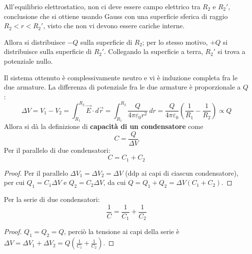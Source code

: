 \documentclass[10pt, a4paper]{scrartcl}
\numberwithin{equation}{subsection}
\theoremstyle{style1}
\newenvironment{boxenv}[1][]{
    \begin{eqbox}[#1]
    }{
   \end{eqbox}
}
\begin{document}
All'equilibrio elettrostatico, non ci deve essere campo elettrico tra $R_2$ e $R_2'$, conclusione che si ottiene usando Gauss con una superficie sferica di raggio $R_2 < r<R_2'$, visto che non vi devono essere cariche interne.

Allora si distribuisce $-Q$ sulla superficie di $R_2$; per lo stesso motivo, $+Q$ si distribuisce sulla superficie di $R_2'$. Collegando la superficie a terra, $R_2'$ si trova a potenziale nullo. 

Il sistema ottenuto \`e complessivamente neutro e vi \`e induzione completa fra le due armature. La differenza di potenziale fra le due armature \`e proporzionale a $Q$:
\begin{equation}
	\Delta V = V_1 - V_2 = \int_{R_1} ^{R_{2} } \vec{E}\cdot d\vec{r}  = \int_{R_1} ^{R_2} \frac{Q}{4\pi \varepsilon _0 r^2}\ dr = \frac{Q}{4\pi \varepsilon _0}\left(\frac{1}{R_1}- \frac{1}{R_{2} }\right) \propto Q 
\end{equation}
Allora si d\`a la definizione di \textbf{capacit\`a di un condensatore} come 
\begin{equation}
	C = \frac{Q}{\Delta V}
\end{equation}
Per il parallelo di due condensatori:
\begin{equation}
	C = C_1 + C_2
\end{equation}
\begin{boxenv}[]
\begin{proof}
	Per il parallelo $\Delta V_1 = \Delta V_2 = \Delta V$ (ddp ai capi di ciascun condensatore), per cui $Q_1=C_1\Delta V$ e $Q_2 = C_2 \Delta V$, da cui $Q = Q_1+Q_2 = \Delta V(C_1+C_2)$.
\end{proof}
\end{boxenv}
Per la serie di due condensatori:
\begin{equation}
	\frac{1}{C} = \frac{1}{C_1}+\frac{1}{C_2}
\end{equation}
\begin{boxenv}
\begin{proof}
	$Q_1=Q_2=Q$, perci\`o la tensione ai capi della serie \`e $\Delta V= \Delta V_1 + \Delta V_2= Q \left(\frac{1}{C_1}+\frac{1}{C_2}\right) $.
\end{proof}
\end{boxenv}
\end{document}
